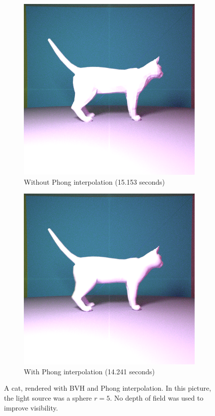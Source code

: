 \documentclass{amsart}
\begin{document}
\begin{figure}
     \centering
     \begin{subfigure}[b]{0.7\textwidth}
         \centering
         \includegraphics[width=\textwidth]{img/fig6_1.png}
         \caption{Without Phong interpolation (15.153 seconds)}
     \end{subfigure}
     \hfill
     \begin{subfigure}[b]{0.7\textwidth}
         \centering
         \includegraphics[width=\textwidth]{img/fig6_2.png}
         \caption{With Phong interpolation (14.241 seconds)}
     \end{subfigure}
     \caption{A cat, rendered with BVH and Phong interpolation. In this picture, the light source was a sphere $r = 5$. No depth of field was used to improve visibility.}
\end{figure}
\end{document}
